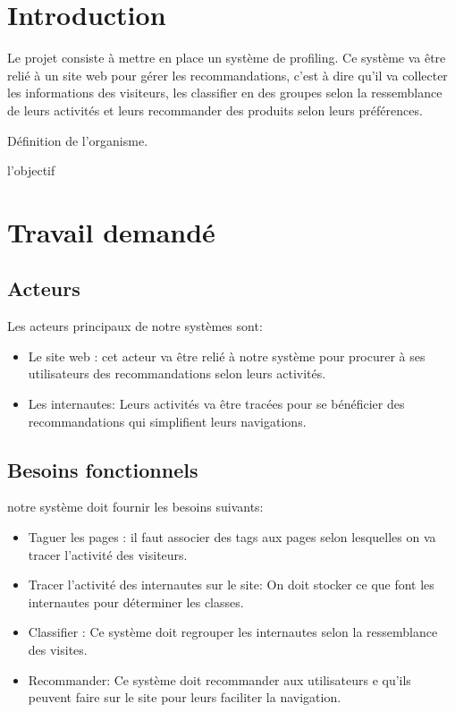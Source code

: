  \newpage
\thispagestyle{empty}
\section{Introduction}

Le projet consiste à mettre en place un système de profiling. Ce système va être relié à un site web pour gérer les recommandations, c'est à dire qu'il va collecter les informations des visiteurs, les classifier en des groupes selon la ressemblance de leurs activités et leurs recommander des produits selon leurs préférences.

Définition de l'organisme.

l'objectif

\section{Travail demandé}

\subsection{Acteurs}

Les acteurs principaux de notre systèmes sont:


\begin{itemize}
    \item Le site web : cet acteur va être relié à notre système pour procurer à ses utilisateurs des recommandations selon leurs activités.
    
    \item Les internautes: Leurs activités va être tracées pour se bénéficier des recommandations qui simplifient leurs navigations.
\end{itemize}

\subsection{Besoins fonctionnels }
notre système doit fournir les besoins suivants:

\begin{itemize}
    \item Taguer les pages : il faut associer des tags aux pages selon lesquelles on va tracer l'activité des visiteurs.
    
    \item Tracer l'activité des internautes sur le site: On doit stocker ce que font les internautes pour déterminer les classes.
    
    \item Classifier : Ce système doit regrouper les internautes selon la ressemblance des visites.
    
    \item Recommander: Ce système doit recommander aux utilisateurs e qu'ils peuvent faire sur le site pour leurs faciliter la navigation.
\end{itemize}

